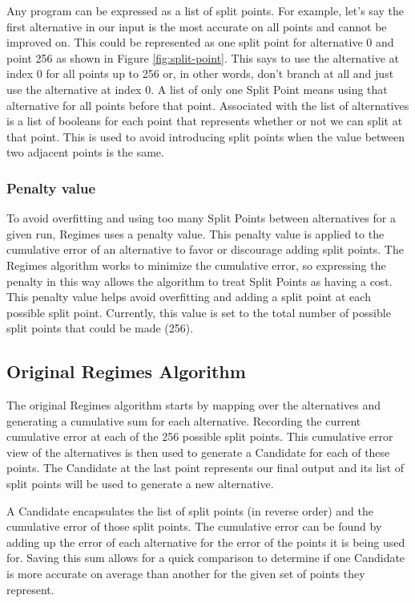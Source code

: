 \documentclass{article}
\begin{document}
Any program can be expressed as a list of split points. For example, let’s say the first alternative in our input is the most accurate on all points and cannot be improved on. This could be represented as one split point for alternative 0 and point 256 as shown in Figure \ref{fig:split-point}. This says to use the alternative at index 0 for all points up to 256 or, in other words, don’t branch at all and just use the alternative at index 0. A list of only one Split Point means using that alternative for all points before that point. Associated with the list of alternatives is a list of booleans for each point that represents whether or not we can split at that point. This is used to avoid introducing split points when the value between two adjacent points is the same.

\subsubsection{Penalty value}

To avoid overfitting and using too many Split Points between alternatives for a given run, Regimes uses a penalty value. This penalty value is applied to the cumulative error of an alternative to favor or discourage adding split points. The Regimes algorithm works to minimize the cumulative error, so expressing the penalty in this way allows the algorithm to treat Split Points as having a cost. This penalty value helps avoid overfitting and adding a split point at each possible split point. Currently, this value is set to the total number of possible split points that could be made (256).

\subsection{Original Regimes Algorithm}
The original Regimes algorithm starts by mapping over the alternatives and generating a cumulative sum for each alternative. Recording the current cumulative error at each of the 256 possible split points. This cumulative error view of the alternatives is then used to generate a Candidate for each of these points. The Candidate at the last point represents our final output and its list of split points will be used to generate a new alternative.

A Candidate encapsulates the list of split points (in reverse order) and the cumulative error of those split points. The cumulative error can be found by adding up the error of each alternative for the error of the points it is being used for. Saving this sum allows for a quick comparison to determine if one Candidate is more accurate on average than another for the given set of points they represent. 
\end{document}
